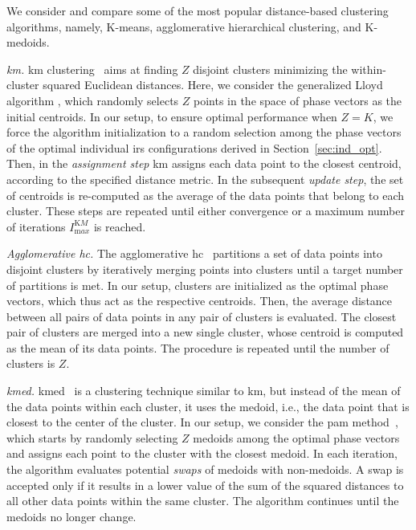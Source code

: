 We consider and compare some of the most popular distance-based clustering algorithms, namely, K-means, agglomerative hierarchical clustering, and K-medoids.  

\emph{\gls{km}.}
\gls{km} clustering~\cite{rokach2005clustering} aims at finding $Z$ disjoint clusters minimizing the within-cluster squared Euclidean distances. Here, we consider the generalized Lloyd algorithm \cite{Kmeans}, which randomly selects $Z$ points in the space of phase vectors as the initial centroids. In our setup, to ensure optimal performance when $Z=K$, we force the algorithm initialization to a random selection among the phase vectors of the optimal individual \gls{irs} configurations derived in Section~\ref{sec:ind_opt}. Then, in the \textit{assignment step} \gls{km} assigns each data point to the closest centroid, according to the specified distance metric. 
In the subsequent \textit{update step}, the set of centroids is re-computed as the average of the data points that belong to each cluster. These steps are repeated until either convergence or a maximum number of iterations $I_{\mathrm max}^{\mathrm KM}$ is reached.
 
\emph{Agglomerative \gls{hc}.}
The agglomerative \gls{hc}~\cite{murtagh2012algorithms} partitions a set of data points into disjoint clusters by iteratively merging points into clusters until a target number of partitions is met.
In our setup, clusters are initialized as the optimal phase vectors, which thus act as the respective centroids. Then, the average distance between all pairs of data points in any pair of clusters is evaluated. The closest pair of clusters are merged into a new single cluster, whose centroid is computed as the mean of its data points. The procedure is repeated until the number of clusters is $Z$. 

\emph{\gls{kmed}.}
\gls{kmed}~\cite{kaufman1987clustering} is a clustering technique similar to \gls{km}, but instead of the mean of the data points within each cluster, it uses the medoid, i.e., the data point that is closest to the center of the cluster. In our setup, we consider the \gls{pam} method~\cite{van2003new}, which starts by randomly selecting $Z$ medoids among the optimal phase vectors and assigns each point to the cluster with the closest medoid. In each iteration, the algorithm evaluates potential \textit{swaps} of medoids with non-medoids. A swap is accepted only if it results in a lower value of the sum of the squared distances to all other data points within the same cluster. The algorithm continues until the medoids no longer change.

